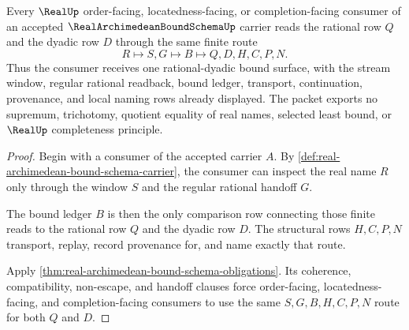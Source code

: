 \begin{theorem}
\label{thm:real-archimedean-bound-schema-rat-dyadic-handoff}
Every $\RealUp$ order-facing, locatedness-facing, or completion-facing consumer of an accepted $\RealArchimedeanBoundSchemaUp$ carrier reads the rational row $Q$ and the dyadic row $D$ through the same finite route
$$
R \longmapsto S,G \longmapsto B \longmapsto Q,D,H,C,P,N .
$$
Thus the consumer receives one rational-dyadic bound surface, with the stream window, regular rational readback, bound ledger, transport, continuation, provenance, and local naming rows already displayed. The packet exports no supremum, trichotomy, quotient equality of real names, selected least bound, or $\RealUp$ completeness principle.
\end{theorem}
\begin{proof}
Begin with a consumer of the accepted carrier $A$. By \autoref{def:real-archimedean-bound-schema-carrier}, the consumer can inspect the real name $R$ only through the window $S$ and the regular rational handoff $G$.

The bound ledger $B$ is then the only comparison row connecting those finite reads to the rational row $Q$ and the dyadic row $D$. The structural rows $H,C,P,N$ transport, replay, record provenance for, and name exactly that route.

Apply \autoref{thm:real-archimedean-bound-schema-obligations}. Its coherence, compatibility, non-escape, and handoff clauses force order-facing, locatedness-facing, and completion-facing consumers to use the same $S,G,B,H,C,P,N$ route for both $Q$ and $D$.
\end{proof}


\begin{closurestatus}{\RealArchimedeanBoundSchemaUp}
  \theoryclosure{\seedClosure}
  \formalstatus{\unformalizedV}
\end{closurestatus}
